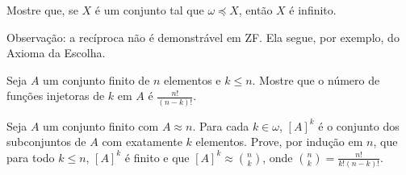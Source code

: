 \begin{exercise}
    Mostre que, se $X$ é um conjunto tal que $\omega\preceq X$, então $X$ é infinito.

    Observação: a recíproca não é demonstrável em ZF. Ela segue, por exemplo, do Axioma da Escolha.
\end{exercise}

\begin{exercise}
    Seja $A$ um conjunto finito de $n$ elementos e $k\leq n$.
    Mostre que o número de funções injetoras de $k$ em $A$ é $\frac{n!}{(n-k)!}$.
\end{exercise}


\begin{exercise}
    Seja $A$ um conjunto finito com $A\approx n$.
    Para cada $k \in \omega$, $[A]^k$ é o conjunto dos subconjuntos de $A$ com exatamente $k$ elementos.
    Prove, por indução em $n$, que para todo $k\leq n$, $[A]^k$ é finito e que $[A]^k\approx \binom{n}{k}$, onde $\binom{n}{k}=\frac{n!}{k!(n-k)!}$.
\end{exercise}
